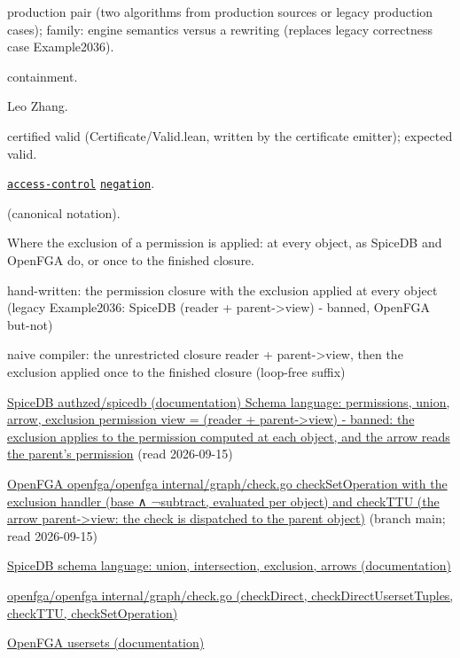 \documentclass[10pt]{article}
\begin{document}
\begin{description}[leftmargin=2.6cm,style=nextline,itemsep=1pt]

\item[Category] production pair (two algorithms from production sources or legacy production cases); family: engine semantics versus a rewriting (replaces legacy correctness case Example2036).

\item[Kind] containment.

\item[Contributors] Leo Zhang.

\item[Status] certified valid (Certificate/Valid.lean, written by the certificate emitter); expected valid.

\item[Tags] \hyperref[tag:access-control]{\texttt{access-control}} \hyperref[tag:negation]{\texttt{negation}}.

\item[Input]  (canonical notation).

\item[Summary] Where the exclusion of a permission is applied: at every object, as SpiceDB and OpenFGA do, or once to the finished closure.

\item[Sides] hand-written: the permission closure with the exclusion applied at every object (legacy Example2036: SpiceDB (reader + parent-\textgreater{}view) - banned, OpenFGA but-not) \par naive compiler: the unrestricted closure reader + parent-\textgreater{}view, then the exclusion applied once to the finished closure (loop-free suffix)

\item[Sources] {\raggedright \href{https://authzed.com/docs/spicedb/concepts/schema}{SpiceDB authzed/spicedb (documentation) Schema language: permissions, union, arrow, exclusion permission view = (reader + parent-\textgreater{}view) - banned: the exclusion applies to the permission computed at each object, and the arrow reads the parent's permission} (read 2026-09-15) \par \href{https://github.com/openfga/openfga/blob/main/internal/graph/check.go}{OpenFGA openfga/openfga internal/graph/check.go checkSetOperation with the exclusion handler (base ∧ ¬subtract, evaluated per object) and checkTTU (the arrow parent-\textgreater{}view: the check is dispatched to the parent object)} (branch main; read 2026-09-15) \par \href{https://authzed.com/docs/spicedb/concepts/schema}{SpiceDB schema language: union, intersection, exclusion, arrows (documentation)} \par \href{https://github.com/openfga/openfga/blob/main/internal/graph/check.go}{openfga/openfga internal/graph/check.go (checkDirect, checkDirectUsersetTuples, checkTTU, checkSetOperation)} \par \href{https://openfga.dev/docs/modeling/building-blocks/usersets}{OpenFGA usersets (documentation)}\par}


\end{description}
\end{document}
